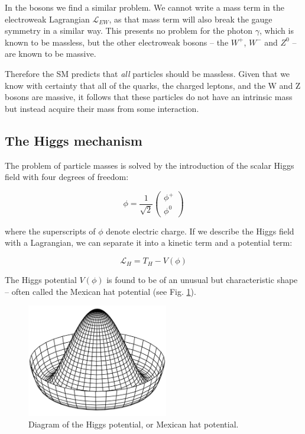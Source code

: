In the bosons we find a similar problem. We cannot write a mass term in the electroweak Lagrangian $\mathcal{L}_{EW}$, as that mass term will also break the gauge symmetry in a similar way. This presents no problem for the photon $\gamma$, which is known to be massless, but the other electroweak bosons -- the $W^+$, $W^-$ and $Z^0$ -- are known to be massive.

Therefore the \acrshort{SM} predicts that \textit{all} particles should be massless. Given that we know with certainty that all of the quarks, the charged leptons, and the W and Z bosons are massive, it follows that these particles do not have an intrinsic mass but instead acquire their mass from some interaction.

\subsection{The Higgs mechanism}
The problem of particle masses is solved by the introduction of the scalar Higgs field with four degrees of freedom:

\begin{equation}
	\phi = \frac{1}{\sqrt{2}} \begin{pmatrix}
	\phi^+ \\
	\phi^0
	\end{pmatrix}
\label{higgs-field}
\end{equation}

where the superscripts of $\phi$ denote electric charge. If we describe the Higgs field with a Lagrangian, we can separate it into a kinetic term and a potential term:

\begin{equation}
	\mathcal{L}_{H} = T_H - V(\phi)
\label{eq:lagrangian-higgs}
\end{equation}

The Higgs potential $V(\phi)$ is found to be of an unusual but characteristic shape -- often called the Mexican hat potential (see Fig. \ref{figure:colliders/mexican-hat}).

\begin{figure}[h]
	\centering
	\includegraphics[width=0.55\textwidth]{../Pictures/MexicanHatPotential.png}
	\caption{Diagram of the Higgs potential, or Mexican hat potential.}
	\label{figure:colliders/mexican-hat}
\end{figure}

